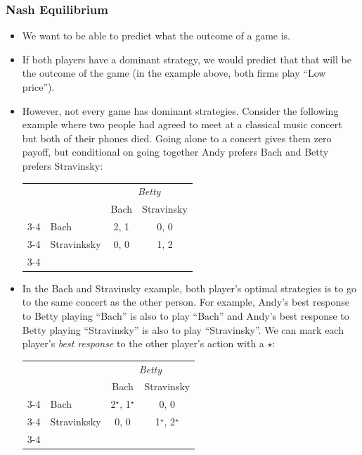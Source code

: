 \documentclass{article}
\begin{document}
\subsubsection*{Nash Equilibrium}
\begin{itemize}
  \item We want to be able to predict what the outcome of a game is.
  \item If both players have a dominant strategy, we would predict that that will be the outcome of the game (in the example above, both firms play ``Low price'').
  \item However, not every game has dominant strategies. Consider the following example where two people had agreed to meet at a classical music concert but both of their phones died. Going alone to a concert gives them zero payoff, but conditional on going together Andy prefers Bach and Betty prefers Stravinsky:
    \begin{center}
      \begin{tabular}{llcc}
        & & \multicolumn{2}{c}{\emph{Betty}} \\
        & & Bach & Stravinsky \\ \cline{3-4}
        \multirow{2}{*}{\emph{Andy}} & Bach & \multicolumn{1}{|c|}{2, 1} & \multicolumn{1}{c|}{0, 0} \\ \cline{3-4}
        & Stravinksky & \multicolumn{1}{|c|}{0, 0} & \multicolumn{1}{c|}{1, 2} \\ \cline{3-4}
      \end{tabular}
    \end{center}
  \item In the Bach and Stravinsky example, both player's optimal strategies is to go to the same concert as the other person. For example, Andy's best response to Betty playing ``Bach'' is also to play ``Bach'' and Andy's best response to Betty playing ``Stravinsky'' is also to play ``Stravinsky''. We can mark each player's \emph{best response} to the other player's action with a $\star$:
    \begin{center}
      \begin{tabular}{llcc}
        & & \multicolumn{2}{c}{\emph{Betty}} \\
        & & Bach & Stravinsky \\ \cline{3-4}
        \multirow{2}{*}{\emph{Andy}} & Bach & \multicolumn{1}{|c|}{2$^\star$, 1$^\star$} & \multicolumn{1}{c|}{0, 0} \\ \cline{3-4}
        & Stravinksky & \multicolumn{1}{|c|}{0, 0} & \multicolumn{1}{c|}{1$^\star$, 2$^\star$} \\ \cline{3-4}

\end{tabular}
\end{center}
\end{itemize}
\end{document}
